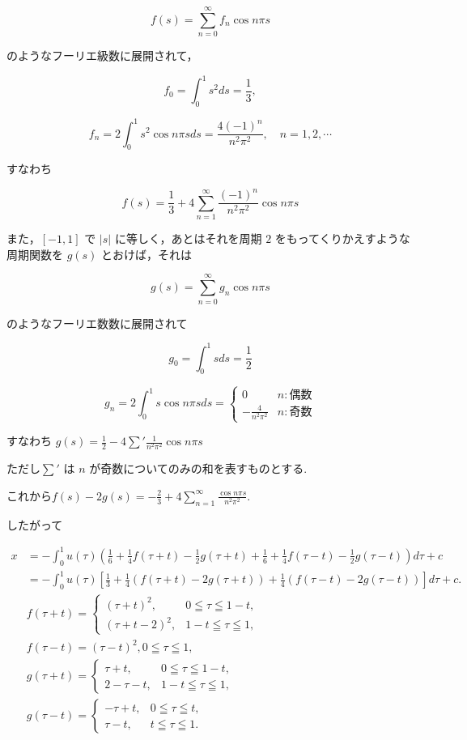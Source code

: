 \documentclass{jsarticle}
\begin{document}
$$
f(s)=\sum_{n=0}^{\infty} f_{n} \cos n \pi s
$$

のようなフーリエ級数に展開されて，

$$
f_{0}=\int_{0}^{1} s^{2} d s=\frac{1}{3},
$$

$$
f_{n}=2 \int_{0}^{1} s^{2} \cos n \pi s d s=\frac{4(-1)^{n}}{n^{2} \pi^{2}}, \quad n=1,2, \cdots
$$

すなわち

$$
f(s)=\frac{1}{3}+4 \sum_{n=1}^{\infty} \frac{(-1)^{n}}{n^{2} \pi^{2}} \cos n \pi s
$$

また，$[-1,1]$ で $|s|$ に等しく，あとはそれを周期 $2$ をもってくりかえすような周期関数を $g(s)$ とおけば，それは

$$
g(s)=\sum_{n=0}^{\infty} g_{n} \cos n \pi s
$$

のようなフーリエ数数に展開されて

$$
g_{0}=\int_{0}^{1} s d s=\frac{1}{2}
$$

$$
g_n = 2\int_0^1 s\cos n\pi s ds 
= \begin{cases}
0 & n:偶数\\
-\frac{4}{n^2\pi^2} & n:奇数
\end{cases}
$$

すなわち $g(s) = \frac{1}{2} - 4\sum' \frac{1}{n^2\pi^2} \cos n\pi s$

ただし$\sum'$ は $n$ が奇数についてのみの和を表すものとする.

これから$f(s)-2 g(s)=-\displaystyle \frac{2}{3}+4 \sum_{n=1}^{\infty} \frac{\cos n \pi s}{n^{2} \pi^{2}}$.

したがって

$$
\begin{aligned}
x &= -\int_{0}^{1} u(\tau)\left(\frac{1}{6}+\frac{1}{4} f(\tau+t)-\frac{1}{2} g(\tau+t)+\frac{1}{6}+\frac{1}{4} f(\tau-t)-\frac{1}{2} g(\tau-t)\right) d \tau+c \\
&=-\int_{0}^{1} u(\tau)\left[\frac{1}{3}+\frac{1}{4}(f(\tau+t)-2 g(\tau+t)) + \frac{1}{4}(f(\tau-t)-2 g(\tau-t))\right] d \tau+c . \\
& f(\tau+t)= \begin{cases}(\tau+t)^{2}, & 0 \leqq \tau \leqq 1-t, \\
(\tau+t-2)^{2}, & 1-t \leqq \tau \leqq 1,\end{cases} \\
& f(\tau-t)=(\tau-t)^{2}, 0 \leqq \tau \leqq 1, \\
& g(\tau+t)= \begin{cases}\tau+t, & 0 \leqq \tau \leqq 1-t, \\
2-\tau-t, & 1-t \leqq \tau \leqq 1,\end{cases} \\
& g(\tau-t)= \begin{cases}-\tau+t, & 0 \leqq \tau \leqq t, \\
\tau-t, & t \leqq \tau \leqq 1 .\end{cases}
\end{aligned}
$$
\end{document}
